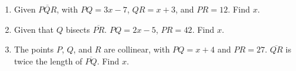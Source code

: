 \documentclass[12pt, twoside]{article}
\begin{document}
\begin{enumerate}
\item Given $\overline{PQR}$, with $PQ=3x-7$, $QR=x+3$, and $PR=12$. Find ${x}$.
\vspace{4cm}

\item Given that $Q$ bisects $\overline{PR}$. $PQ=2x-5$, $PR=42$. Find ${x}$.
\vspace{4cm}

\item The points $P$, $Q$, and $R$ are collinear, with $PQ=x+4$ and $PR=27$. $\overline{QR}$ is twice the length of $\overline{PQ}$. Find ${x}$.




\end{enumerate}
\end{document}
